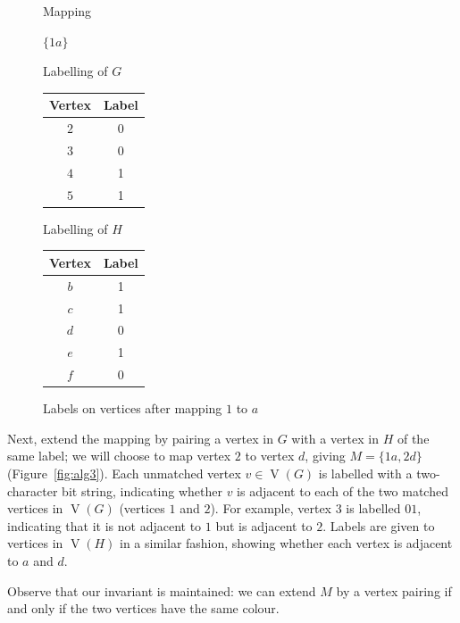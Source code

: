 \documentclass[letterpaper]{article}
\DeclareMathOperator{\V}{V}
\begin{document}
\begin{figure}[ht]
\centering
\begin{minipage}[t]{0.15\linewidth}
    Mapping

    \bigskip

    $\{1a\}$
\end{minipage}
\quad
\begin{minipage}[t]{0.3\linewidth}
    Labelling of $G$
    \begin{tabular}[t]{cc}
    \hline
        Vertex & Label\\
    \hline
        $2$ & 0 \\
        $3$ & 0 \\
        $4$ & 1 \\
        $5$ & 1 \\
    \hline
    \end{tabular}
\end{minipage}
\quad
\begin{minipage}[t]{0.3\linewidth}
    Labelling of $H$
    \begin{tabular}[t]{cc}
    \hline
        Vertex & Label\\
    \hline
        $b$ & 1 \\
        $c$ & 1 \\
        $d$ & 0 \\
        $e$ & 1 \\
        $f$ & 0 \\
    \hline
    \end{tabular}
\end{minipage}
    \caption{Labels on vertices after mapping $1$ to $a$}
\label{fig:alg2}
\end{figure}

Next, extend the mapping by pairing a vertex in $G$ with a vertex in $H$ of the
same label; we will choose to map vertex $2$ to vertex $d$, giving $M=\{1a,
2d\}$ (Figure~\ref{fig:alg3}).  Each unmatched vertex $v \in \V(G)$ is labelled
with a two-character bit string, indicating whether $v$ is adjacent to each of
the two matched vertices in $\V(G)$ (vertices $1$ and $2$).  For example, vertex
$3$ is labelled $01$, indicating that it is not adjacent to $1$ but is adjacent
to $2$.  Labels are given to vertices in $\V(H)$ in a similar fashion, showing
whether each vertex is adjacent to $a$ and $d$.

Observe that our invariant is maintained: we can extend $M$ by a vertex pairing if
and only if the two vertices have the same colour.
\end{document}
